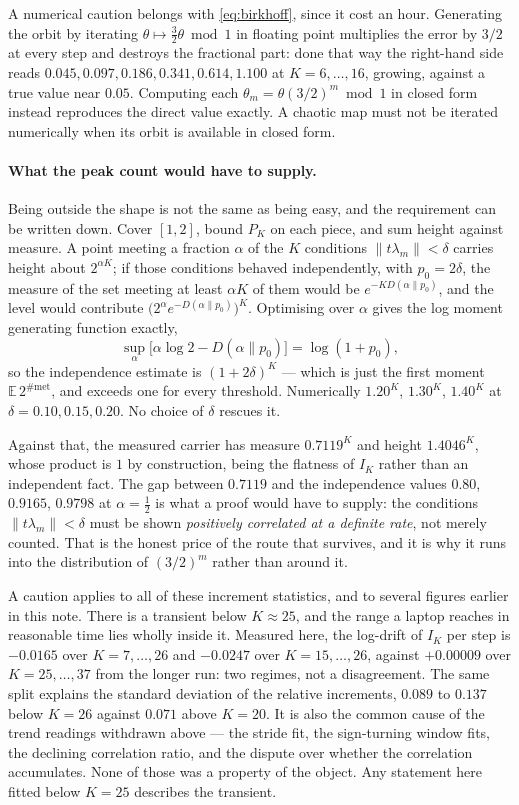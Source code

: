 \documentclass[11pt]{article}
\theoremstyle{remark}
\newcommand{\lam}{\lambda}
\begin{document}
A numerical caution belongs with \eqref{eq:birkhoff}, since it cost an hour. Generating the orbit by
iterating $\theta\mapsto\tfrac32\theta\bmod1$ in floating point multiplies the error by $3/2$ at every
step and destroys the fractional part: done that way the right-hand side reads $0.045,0.097,0.186,0.341,
0.614,1.100$ at $K=6,\dots,16$, growing, against a true value near $0.05$. Computing each
$\theta_m=\theta(3/2)^m\bmod1$ in closed form instead reproduces the direct value exactly. A chaotic map
must not be iterated numerically when its orbit is available in closed form.

\paragraph{What the peak count would have to supply.} Being outside the shape is not the same as being
easy, and the requirement can be written down. Cover $[1,2]$, bound $P_K$ on each piece, and sum height
against measure. A point meeting a fraction $\alpha$ of the $K$ conditions $\|t\lam_m\|<\delta$ carries
height about $2^{\alpha K}$; if those conditions behaved independently, with $p_0=2\delta$, the measure
of the set meeting at least $\alpha K$ of them would be $e^{-KD(\alpha\|p_0)}$, and the level would
contribute $\bigl(2^\alpha e^{-D(\alpha\|p_0)}\bigr)^K$. Optimising over $\alpha$ gives the log moment
generating function exactly,
\[
  \sup_\alpha\bigl[\alpha\log2-D(\alpha\|p_0)\bigr]=\log(1+p_0),
\]
so the independence estimate is $(1+2\delta)^K$ --- which is just the first moment
$\mathbb E\,2^{\#\text{met}}$, and exceeds one for every threshold. Numerically $1.20^K$, $1.30^K$,
$1.40^K$ at $\delta=0.10,0.15,0.20$. No choice of $\delta$ rescues it.

Against that, the measured carrier has measure $0.7119^K$ and height $1.4046^K$, whose product is $1$ by
construction, being the flatness of $I_K$ rather than an independent fact. The gap between $0.7119$ and
the independence values $0.80$, $0.9165$, $0.9798$ at $\alpha=\tfrac12$ is what a proof would have to
supply: the conditions $\|t\lam_m\|<\delta$ must be shown \emph{positively correlated at a definite
rate}, not merely counted. That is the honest price of the route that survives, and it is why it runs
into the distribution of $(3/2)^m$ rather than around it.

A caution applies to all of these increment statistics, and to several figures earlier in this note.
There is a transient below $K\approx25$, and the range a laptop reaches in reasonable time lies wholly
inside it. Measured here, the log-drift of $I_K$ per step is $-0.0165$ over $K=7,\dots,26$ and $-0.0247$
over $K=15,\dots,26$, against $+0.00009$ over $K=25,\dots,37$ from the longer run: two regimes, not a
disagreement. The same split explains the standard deviation of the relative increments, $0.089$ to
$0.137$ below $K=26$ against $0.071$ above $K=20$. It is also the common cause of the trend readings
withdrawn above --- the stride fit, the sign-turning window fits, the declining correlation ratio, and
the dispute over whether the correlation accumulates. None of those was a property of the object. Any
statement here fitted below $K=25$ describes the transient.
\end{document}
